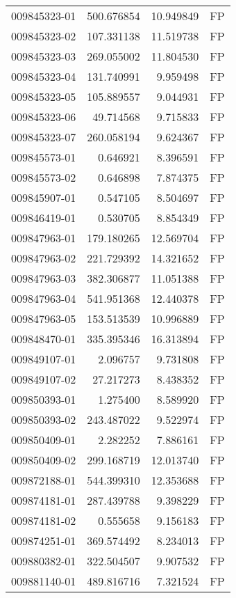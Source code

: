 \begin{tabular}{lrrl}
009845323-01 &  500.676854 &    10.949849 &   FP \\
009845323-02 &  107.331138 &    11.519738 &   FP \\
009845323-03 &  269.055002 &    11.804530 &   FP \\
009845323-04 &  131.740991 &     9.959498 &   FP \\
009845323-05 &  105.889557 &     9.044931 &   FP \\
009845323-06 &   49.714568 &     9.715833 &   FP \\
009845323-07 &  260.058194 &     9.624367 &   FP \\
009845573-01 &    0.646921 &     8.396591 &   FP \\
009845573-02 &    0.646898 &     7.874375 &   FP \\
009845907-01 &    0.547105 &     8.504697 &   FP \\
009846419-01 &    0.530705 &     8.854349 &   FP \\
009847963-01 &  179.180265 &    12.569704 &   FP \\
009847963-02 &  221.729392 &    14.321652 &   FP \\
009847963-03 &  382.306877 &    11.051388 &   FP \\
009847963-04 &  541.951368 &    12.440378 &   FP \\
009847963-05 &  153.513539 &    10.996889 &   FP \\
009848470-01 &  335.395346 &    16.313894 &   FP \\
009849107-01 &    2.096757 &     9.731808 &   FP \\
009849107-02 &   27.217273 &     8.438352 &   FP \\
009850393-01 &    1.275400 &     8.589920 &   FP \\
009850393-02 &  243.487022 &     9.522974 &   FP \\
009850409-01 &    2.282252 &     7.886161 &   FP \\
009850409-02 &  299.168719 &    12.013740 &   FP \\
009872188-01 &  544.399310 &    12.353688 &   FP \\
009874181-01 &  287.439788 &     9.398229 &   FP \\
009874181-02 &    0.555658 &     9.156183 &   FP \\
009874251-01 &  369.574492 &     8.234013 &   FP \\
009880382-01 &  322.504507 &     9.907532 &   FP \\
009881140-01 &  489.816716 &     7.321524 &   FP \\

\end{tabular}
